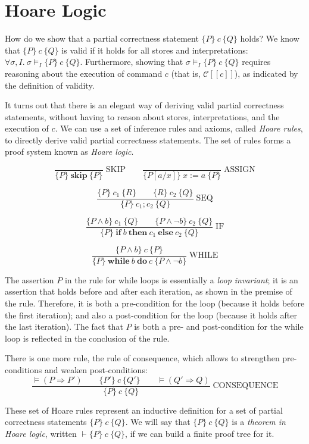 \section{Hoare Logic}

How do we show that a partial correctness statement $\{P\}\ c\ \{Q\}$ holds? We know that
$\{P\}\ c\ \{Q\}$ is valid if it holds for all stores and interpretations: $\forall \sigma,
I.\ \sigma \models_I \{P\}\ c\ \{Q\}$. Furthermore, showing that $\sigma \models_I \{P\}\ c\
\{Q\}$ requires reasoning about the execution of command $c$ (that is,
$\mathcal{C}[\![c]\!]$), as indicated by the definition of validity.

It turns out that there is an elegant way of deriving valid partial correctness statements,
without having to reason about stores, interpretations, and the execution of $c$. We can use a
set of inference rules and axioms, called \emph{Hoare rules}, to directly derive valid partial
correctness statements. The set of rules forms a proof system known as \emph{Hoare logic}.

\[
\frac{}{\{P\}\ \mathbf{skip}\ \{P\}} \; \text{SKIP}
\qquad
\frac{}{\{P[a/x]\}\ x := a\ \{P\}} \; \text{ASSIGN}
\]

\[
\frac{\{P\}\ c_1\ \{R\} \qquad \{R\}\ c_2\ \{Q\}}{\{P\}\ c_1; c_2\ \{Q\}} \; \text{SEQ}
\]

\[
\frac{\{P \wedge b\}\ c_1\ \{Q\} \qquad \{P \wedge \neg b\}\ c_2\ \{Q\}}{\{P\}\
\mathbf{if}\ b\ \mathbf{then}\ c_1\ \mathbf{else}\ c_2\ \{Q\}} \; \text{IF}
\]

\[
\frac{\{P \wedge b\}\ c\ \{P\}}{\{P\}\ \mathbf{while}\ b\ \mathbf{do}\ c\ \{P \wedge \neg b\}}
\; \text{WHILE}
\]

The assertion $P$ in the rule for while loops is essentially a \emph{loop invariant}; it is an
assertion that holds before and after each iteration, as shown in the premise of the rule.
Therefore, it is both a pre-condition for the loop (because it holds before the first
iteration); and also a post-condition for the loop (because it holds after the last iteration).
The fact that $P$ is both a pre- and post-condition for the while loop is reflected in the
conclusion of the rule.

There is one more rule, the rule of consequence, which allows to strengthen pre-conditions and
weaken post-conditions:
\[
\frac{\models (P \Rightarrow P') \qquad \{P'\}\ c\ \{Q'\} \qquad \models (Q' \Rightarrow
Q)}{\{P\}\ c\ \{Q\}} \; \text{CONSEQUENCE}
\]

These set of Hoare rules represent an inductive definition for a set of partial correctness
statements $\{P\}\ c\ \{Q\}$. We will say that $\{P\}\ c\ \{Q\}$ is a \emph{theorem in Hoare
logic}, written $\vdash \{P\}\ c\ \{Q\}$, if we can build a finite proof tree for it.

